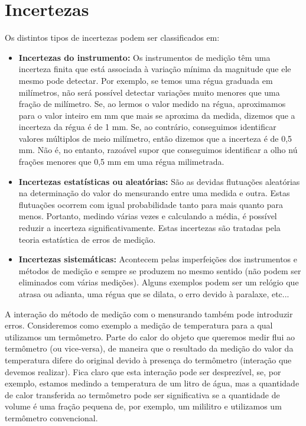 \section*{Incertezas}
Os distintos tipos de incertezas podem ser classificados em:
\begin{itemize}
\item {\bf Incertezas do instrumento:} Os instrumentos de medição têm uma incerteza finita que está associada à variação mínima da magnitude que ele mesmo pode detectar. Por exemplo, se temos uma régua graduada em milímetros, não será possível detectar variações muito menores que uma fração de milímetro. Se, ao lermos o valor medido na régua, aproximamos para o valor inteiro em mm que mais se aproxima da medida, dizemos que a incerteza da régua é de 1 mm. Se, ao contrário, conseguimos identificar valores múltiplos de meio milímetro, então dizemos que a incerteza é de 0,5 mm. Não é, no entanto, razoável supor que conseguimos identificar a olho nú frações menores que 0,5 mm em uma régua milimetrada.

\item {\bf Incertezas estatísticas ou aleatórias:} São as devidas flutuações aleatórias na deter\-mi\-na\-ção do valor do mensurando entre uma medida e outra.  Estas flutuações ocorrem com igual probabilidade tanto para mais quanto para menos. Portanto, medindo várias vezes e calculando a média, é possível reduzir a incerteza significativamente. Estas incertezas são tratadas pela teoria estatística de erros de medição.

\item {\bf Incertezas sistemáticas:} Acontecem pelas imperfeições dos instrumentos e métodos de medição e sempre se produzem no mesmo sentido (não podem ser eliminados com várias medições). Alguns exemplos podem ser um relógio que atrasa ou adianta, uma régua que se dilata, o erro devido à paralaxe, etc... 
\end{itemize}

A interação do método de medição com o mensurando também pode introduzir erros.  Consideremos como exemplo a medição de temperatura para a qual utilizamos um ter\-mô\-me\-tro. Parte do calor do objeto que queremos medir flui ao termômetro (ou vice-versa), de maneira que o resultado da medição do valor da temperatura difere do original devido à presença do termômetro (interação que devemos realizar). Fica claro que esta interação pode ser desprezível, se, por exemplo, estamos medindo a temperatura de um litro de água, mas a quantidade de calor transferida ao termômetro pode ser significativa se a quantidade de volume é uma fração pequena de, por exemplo, um mililitro e utilizamos um termômetro convencional.

